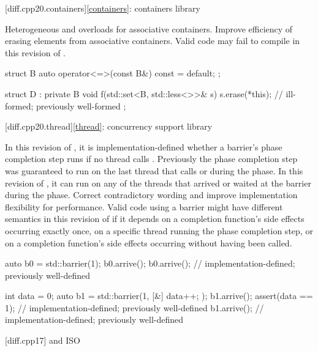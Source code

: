 [diff.cpp20.containers]{\ref{containers}: containers library}

\change
Heterogeneous  and  overloads
for associative containers.
\rationale
Improve efficiency of erasing elements from associative containers.
\effect
Valid \CppXX{} code may fail to compile in this revision of \Cpp{}.
\begin{example}
\begin{codeblock}
struct B {
  auto operator<=>(const B&) const = default;
};

struct D : private B {
  void f(std::set<B, std::less<>>& s) {
    s.erase(*this);             // ill-formed; previously well-formed
  }
};
\end{codeblock}
\end{example}

[diff.cpp20.thread]{\ref{thread}: concurrency support library}

\change
In this revision of \Cpp{},
it is implementation-defined whether a barrier's phase completion step runs
if no thread calls .
Previously the phase completion step was guaranteed to run on the last thread that calls  or  during the phase.
In this revision of \Cpp{},
it can run on any of the threads that arrived or waited at the barrier
during the phase.
\rationale
Correct contradictory wording and
improve implementation flexibility for performance.
\effect
Valid \CppXX{} code using a barrier might have
different semantics in this revision of \Cpp{}
if it depends on a completion function's side effects occurring exactly once,
on a specific thread running the phase completion step, or
on a completion function's side effects occurring
without  having been called.
\begin{example}
\begin{codeblock}
auto b0 = std::barrier(1);
b0.arrive();
b0.arrive();            // implementation-defined; previously well-defined

int data = 0;
auto b1 = std::barrier(1, [&] { data++; });
b1.arrive();
assert(data == 1);      // implementation-defined; previously well-defined
b1.arrive();            // implementation-defined; previously well-defined
\end{codeblock}
\end{example}

[diff.cpp17]{\Cpp{} and ISO \CppXVII{}}


